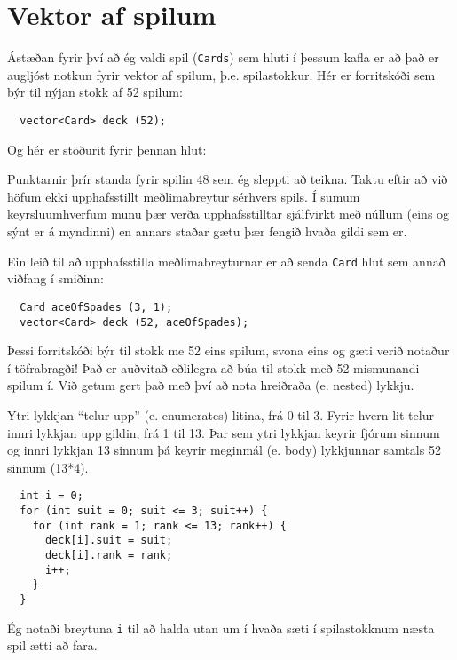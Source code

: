 \section{Vektor af spilum}

Ástæðan fyrir því að ég valdi spil ({\tt Cards}) sem hluti í þessum kafla er að það er augljóst notkun fyrir vektor af spilum, þ.e. spilastokkur.
Hér er forritskóði sem býr til nýjan stokk af 52 spilum:

\begin{verbatim}
  vector<Card> deck (52);
\end{verbatim}
%
Og hér er stöðurit fyrir þennan hlut: 


\vspace{0.1in}
\centerline{}
\vspace{0.1in}

Punktarnir þrír standa fyrir spilin 48 sem ég sleppti að teikna.
Taktu eftir að við höfum ekki upphafsstillt meðlimabreytur sérhvers spils.
Í sumum keyrsluumhverfum munu þær verða upphafsstilltar sjálfvirkt með núllum (eins og sýnt er á myndinni)
en annars staðar gætu þær fengið hvaða gildi sem er.

Ein leið til að upphafsstilla meðlimabreyturnar er að senda {\tt Card} hlut sem annað viðfang í smiðinn:

\begin{verbatim}
  Card aceOfSpades (3, 1);
  vector<Card> deck (52, aceOfSpades);
\end{verbatim}
%

Þessi forritskóði býr til stokk me 52 eins spilum, svona eins og gæti verið notaður í töfrabragði!
Það er auðvitað eðlilegra að búa til stokk með 52 mismunandi spilum í.
Við getum gert það með því að nota hreiðraða (e. nested) lykkju.


Ytri lykkjan ``telur upp'' (e. enumerates) litina, frá 0 til 3.
Fyrir hvern lit telur innri lykkjan upp gildin, frá 1 til 13.
Þar sem ytri lykkjan keyrir fjórum sinnum og innri lykkjan 13 sinnum þá keyrir meginmál (e. body) lykkjunnar samtals 52 sinnum (13*4).

\begin{verbatim}
  int i = 0;
  for (int suit = 0; suit <= 3; suit++) {
    for (int rank = 1; rank <= 13; rank++) {
      deck[i].suit = suit;
      deck[i].rank = rank;
      i++;
    }
  }
\end{verbatim}
%
Ég notaði breytuna {\tt i} til að halda utan um í hvaða sæti í spilastokknum næsta spil ætti að fara. 

